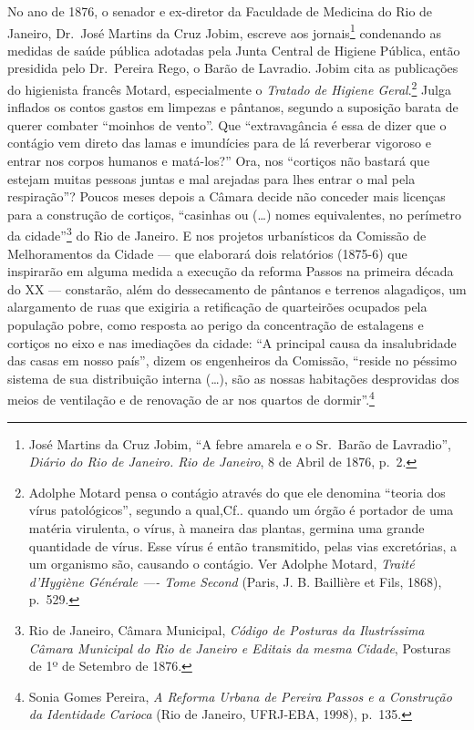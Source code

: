 No ano de 1876, o senador e ex-diretor da Faculdade de Medicina do Rio
de Janeiro, Dr.~José Martins da Cruz Jobim, escreve aos
jornais\footnote{José Martins da Cruz Jobim, ``A febre amarela e o
  Sr.~Barão de Lavradio'', \textit{Diário do Rio de Janeiro. Rio de
  Janeiro}, 8 de Abril de 1876, p.~2.} condenando as medidas de saúde
pública adotadas pela Junta Central de Higiene Pública, então presidida
pelo Dr.~Pereira Rego, o Barão de Lavradio. Jobim cita as publicações do
higienista francês Motard, especialmente o \textit{Tratado de Higiene
Geral}.\footnote{Adolphe Motard pensa o contágio através do que ele
  denomina ``teoria dos vírus patológicos'', segundo a qual,Cf.. quando
  um órgão é portador de uma matéria virulenta, o vírus, à maneira das
  plantas, germina uma grande quantidade de vírus. Esse vírus é então
  transmitido, pelas vias excretórias, a um organismo são, causando o
  contágio. Ver Adolphe Motard, \textit{Traité d'Hygiène Générale ---- Tome
  Second} (Paris, J. B. Baillière et Fils, 1868), p.~529.} Julga
inflados os contos gastos em limpezas e pântanos, segundo a suposição
barata de querer combater ``moinhos de vento''. Que ``extravagância é
essa de dizer que o contágio vem direto das lamas e imundícies para de
lá reverberar vigoroso e entrar nos corpos humanos e matá-los?'' Ora,
nos ``cortiços não bastará que estejam muitas pessoas juntas e mal
arejadas para lhes entrar o mal pela respiração''? Poucos meses depois a
Câmara decide não conceder mais licenças para a construção de cortiços,
``casinhas ou (\ldots{}) nomes equivalentes, no perímetro da
cidade''\footnote{Rio de Janeiro, Câmara Municipal, \textit{Código de
  Posturas da Ilustríssima Câmara Municipal do Rio de Janeiro e Editais
  da mesma Cidade}, Posturas de 1º de Setembro de 1876.} do Rio de
Janeiro. E nos projetos urbanísticos da Comissão de Melhoramentos da
Cidade --- que elaborará dois relatórios (1875-6) que inspirarão em
alguma medida a execução da reforma Passos na primeira década do XX ---
constarão, além do dessecamento de pântanos e terrenos alagadiços, um
alargamento de ruas que exigiria a retificação de quarteirões ocupados
pela população pobre, como resposta ao perigo da concentração de
estalagens e cortiços no eixo e nas imediações da cidade: ``A principal
causa da insalubridade das casas em nosso país'', dizem os engenheiros
da Comissão, ``reside no péssimo sistema de sua distribuição interna
(\dots{}), são as nossas habitações desprovidas dos meios de ventilação e de
renovação de ar nos quartos de dormir''.\footnote{Sonia Gomes Pereira,
  \textit{A Reforma Urbana de Pereira Passos e a Construção da Identidade
  Carioca} (Rio de Janeiro, UFRJ-EBA, 1998), p.~135.}

